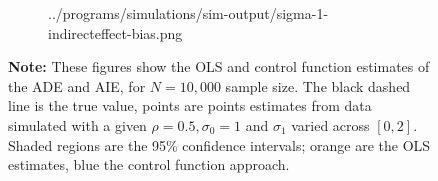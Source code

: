 \begin{figure}[h!]
\begin{subfigure}[c]{0.475\textwidth}
{            ../programs/simulations/sim-output/sigma-1-indirecteffect-bias.png}
    \end{subfigure}
    \label{fig:sigma-1-bias}
    \justify
    \footnotesize    
    \textbf{Note:}
    These figures show the OLS and control function estimates of the ADE and AIE, for $N = 10,000$ sample size.
    The black dashed line is the true value, points are points estimates from data simulated with a given $\rho = 0.5, \sigma_0 = 1$ and $\sigma_1$ varied across $[0, 2]$.
    Shaded regions are the 95\% confidence intervals;
    orange are the OLS estimates, blue the control function approach.
\end{figure}
